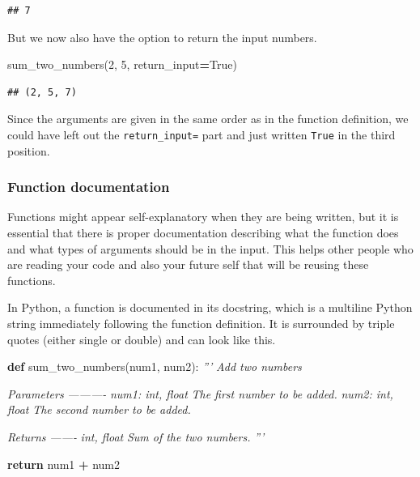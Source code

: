 \documentclass[]{Nemilov}
\newenvironment{Shaded}{\begin{snugshade}}{\end{snugshade}}
\newcommand{\CommentTok}[1]{\textcolor[rgb]{0.56,0.35,0.01}{\textit{#1}}}
\newcommand{\ControlFlowTok}[1]{\textcolor[rgb]{0.13,0.29,0.53}{\textbf{#1}}}
\newcommand{\DecValTok}[1]{\textcolor[rgb]{0.00,0.00,0.81}{#1}}
\newcommand{\KeywordTok}[1]{\textcolor[rgb]{0.13,0.29,0.53}{\textbf{#1}}}
\newcommand{\NormalTok}[1]{#1}
\newcommand{\OperatorTok}[1]{\textcolor[rgb]{0.81,0.36,0.00}{\textbf{#1}}}
\newcommand{\VariableTok}[1]{\textcolor[rgb]{0.00,0.00,0.00}{#1}}
\begin{document}
\begin{verbatim}
## 7
\end{verbatim}

But we now also have the option to return the input numbers.

\begin{Shaded}
\begin{Highlighting}[]
\NormalTok{sum_two_numbers(}\DecValTok{2}\NormalTok{, }\DecValTok{5}\NormalTok{, return_input}\OperatorTok{=}\VariableTok{True}\NormalTok{)}
\end{Highlighting}
\end{Shaded}

\begin{verbatim}
## (2, 5, 7)
\end{verbatim}

Since the arguments are given in the same order as in the function definition,
we could have left out the \texttt{return\_input=} part and just written \texttt{True} in the
third position.

\hypertarget{py-dev-function-documentation}{%
\subsubsection{Function documentation}\label{py-dev-function-documentation}}

Functions might appear self-explanatory when they are being written, but it is
essential that there is proper documentation describing what the function does
and what types of arguments should be in the input. This helps other people who
are reading your code and also your future self that will be reusing these
functions.

In Python, a function is documented in its docstring, which is a multiline
Python string immediately following the function definition. It is surrounded
by triple quotes (either single or double) and can look like this.

\begin{Shaded}
\begin{Highlighting}[]
\KeywordTok{def}\NormalTok{ sum_two_numbers(num1, num2):}
    \CommentTok{'''}
\CommentTok{    Add two numbers}

\CommentTok{    Parameters}
\CommentTok{    ----------}
\CommentTok{    num1: int, float}
\CommentTok{        The first number to be added.}
\CommentTok{    num2: int, float}
\CommentTok{        The second number to be added.}

\CommentTok{    Returns}
\CommentTok{    -------}
\CommentTok{    int, float}
\CommentTok{        Sum of the two numbers.}
\CommentTok{    '''}

    \ControlFlowTok{return}\NormalTok{ num1 }\OperatorTok{+}\NormalTok{ num2}
\end{Highlighting}
\end{Shaded}
\end{document}
